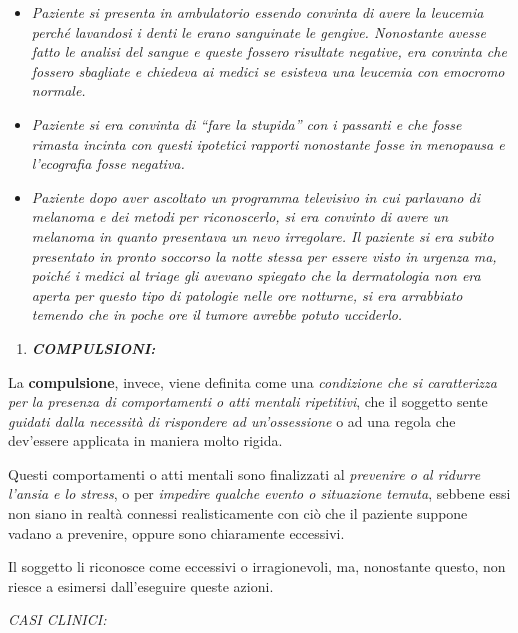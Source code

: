 \documentclass[]{article}
\begin{document}
\begin{itemize}
{  è davvero venuto il dubbio di esserlo.}
\item
  \emph{Paziente si presenta in ambulatorio essendo convinta di avere la
  leucemia perché lavandosi i denti le erano sanguinate le gengive.
  Nonostante avesse fatto le analisi del sangue e queste fossero
  risultate negative, era convinta che fossero sbagliate e chiedeva ai
  medici se esisteva una leucemia con emocromo normale.}
\item
  \emph{Paziente si era convinta di ``fare la stupida'' con i passanti e
  che fosse rimasta incinta con questi ipotetici rapporti nonostante
  fosse in menopausa e l'ecografia fosse negativa.}
\item
  \emph{Paziente dopo aver ascoltato un programma televisivo in cui
  parlavano di melanoma e dei metodi per riconoscerlo, si era convinto
  di avere un melanoma in quanto presentava un nevo irregolare. Il
  paziente si era subito presentato in pronto soccorso la notte stessa
  per essere visto in urgenza ma, poiché i medici al triage gli avevano
  spiegato che la dermatologia non era aperta per questo tipo di
  patologie nelle ore notturne, si era arrabbiato temendo che in poche
  ore il tumore avrebbe potuto ucciderlo. }
\end{itemize}

\begin{enumerate}
\def\labelenumi{\arabic{enumi}.}
\item
  \textbf{\emph{COMPULSIONI:}}
\end{enumerate}

La \textbf{compulsione}, invece, viene definita come una
\emph{condizione che si caratterizza per la presenza di comportamenti o
atti mentali ripetitivi}, che il soggetto sente \emph{guidati dalla
necessità di rispondere ad un'ossessione} o ad una regola che dev'essere
applicata in maniera molto rigida.

Questi comportamenti o atti mentali sono finalizzati al \emph{prevenire
o al ridurre l'ansia e lo stress}, o per \emph{impedire qualche evento o
situazione temuta}, sebbene essi non siano in realtà connessi
realisticamente con ciò che il paziente suppone vadano a prevenire,
oppure sono chiaramente eccessivi.

Il soggetto li riconosce come eccessivi o irragionevoli, ma, nonostante
questo, non riesce a esimersi dall'eseguire queste azioni.

\emph{\emph{CASI CLINICI:}}
\end{document}
